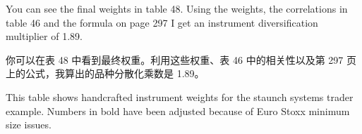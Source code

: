 \begin{englishblock} You can see the final weights in table 48. Using the weights, the correlations in table 46 and the formula on page 297 I get an instrument diversification multiplier of 1.89. \end{englishblock}

\begin{chineseblock}你可以在表 48 中看到最终权重。利用这些权重、表 46 中的相关性以及第 297 页上的公式，我算出的品种分散化乘数是 1.89。 \end{chineseblock}

\begin{bilingualtableblock} 
\end{bilingualtableblock}

\begin{englishblock} This table shows handcrafted instrument weights for the staunch systems trader example. Numbers in bold have been adjusted because of Euro Stoxx minimum size issues. \end{englishblock}

